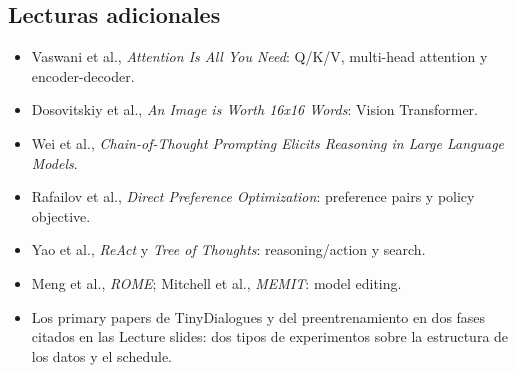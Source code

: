 \subsection{Lecturas adicionales}

\begin{itemize}
  \item Vaswani et al., \emph{Attention Is All You Need}: Q/K/V, multi-head attention y encoder-decoder.
  \item Dosovitskiy et al., \emph{An Image is Worth 16x16 Words}: Vision Transformer.
  \item Wei et al., \emph{Chain-of-Thought Prompting Elicits Reasoning in Large Language Models}.
  \item Rafailov et al., \emph{Direct Preference Optimization}: preference pairs y policy objective.
  \item Yao et al., \emph{ReAct} y \emph{Tree of Thoughts}: reasoning/action y search.
  \item Meng et al., \emph{ROME}; Mitchell et al., \emph{MEMIT}: model editing.
  \item Los primary papers de TinyDialogues y del preentrenamiento en dos fases citados en las Lecture slides: dos tipos de experimentos sobre la estructura de los datos y el schedule.
\end{itemize}


